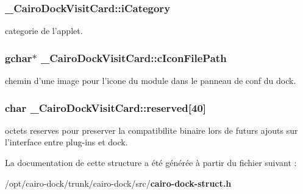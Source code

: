 \subsubsection{ {\bf \_\-CairoDockVisitCard::iCategory}}\label{struct__CairoDockVisitCard_27739ed2aa84ae0abd23adbaeb9dfd61}


categorie de l'applet. 

\subsubsection{\setlength{\rightskip}{0pt plus 5cm}gchar$\ast$ {\bf \_\-CairoDockVisitCard::cIconFilePath}}\label{struct__CairoDockVisitCard_00ac300e133ff92b5ee07e088d68e3c2}


chemin d'une image pour l'icone du module dans le panneau de conf du dock. 

\subsubsection{\setlength{\rightskip}{0pt plus 5cm}char {\bf \_\-CairoDockVisitCard::reserved}[40]}\label{struct__CairoDockVisitCard_8faa02b3122dafb080ee87adcbda06ed}


octets reserves pour preserver la compatibilite binaire lors de futurs ajouts sur l'interface entre plug-ins et dock. 



La documentation de cette structure a été générée à partir du fichier suivant :\begin{CompactItemize}
\item 
/opt/cairo-dock/trunk/cairo-dock/src/{\bf cairo-dock-struct.h}\end{CompactItemize}
